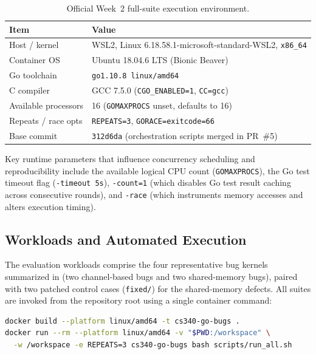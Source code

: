 \begin{table}[H]
  \centering
  \caption{Official Week~2 full-suite execution environment.}
  \label{tab:env-official}
  \small
  \begin{tabularx}{\linewidth}{L{3.25cm}Y}
    \toprule
    Item & Value \\
    \midrule
    Host / kernel        & WSL2, Linux 6.18.58.1-microsoft-standard-WSL2, \texttt{x86\_64} \\
    Container OS         & Ubuntu 18.04.6 LTS (Bionic Beaver) \\
    Go toolchain         & \texttt{go1.10.8 linux/amd64} \\
    C compiler           & GCC 7.5.0 (\texttt{CGO\_ENABLED=1}, \texttt{CC=gcc}) \\
    Available processors & 16 (\texttt{GOMAXPROCS} unset, defaults to 16) \\
    Repeats / race opts  & \texttt{REPEATS=3}, \texttt{GORACE=exitcode=66} \\
    Base commit          & \texttt{312d6da} (orchestration scripts merged in PR~\#5) \\
    \bottomrule
  \end{tabularx}
\end{table}

Key runtime parameters that influence concurrency scheduling and reproducibility include the available logical CPU count (\texttt{GOMAXPROCS}), the Go test timeout flag (\texttt{-timeout 5s}), \texttt{-count=1} (which disables Go test result caching across consecutive rounds), and \texttt{-race} (which instruments memory accesses and alters execution timing).

\subsection{Workloads and Automated Execution}
The evaluation workloads comprise the four representative bug kernels summarized in  (two channel-based bugs and two shared-memory bugs), paired with two patched control cases (\texttt{fixed/}) for the shared-memory defects. All suites are invoked from the repository root using a single container command:

\begin{lstlisting}[language=bash]
docker build --platform linux/amd64 -t cs340-go-bugs .
docker run --rm --platform linux/amd64 -v "$PWD:/workspace" \
  -w /workspace -e REPEATS=3 cs340-go-bugs bash scripts/run_all.sh
\end{lstlisting}

